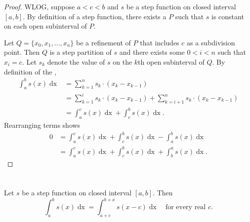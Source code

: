 \documentclass{report}
\begin{document}
\begin{proof}

  WLOG, suppose $a < c < b$ and $s$ be a step function on closed interval
    $[a, b]$.
  By definition of a step function, there exists a 
    $P$ such that $s$ is constant on each open subinterval of $P$.

  Let $Q = \{x_0, x_1, \ldots, x_n\}$ be a refinement of $P$ that includes $c$
    as a subdivision point.
  Then $Q$ is a step partition of $s$ and there exists some $0 < i < n$ such
    that $x_i = c$.
  Let $s_k$ denote the value of $s$ on the $k$th open subinterval of $Q$.
  By definition of the ,
    \begin{align*}
      \int_a^b s(x) \mathop{dx}
        & = \sum_{k=1}^n s_k \cdot (x_k - x_{k - 1}) \\
        & = \sum_{k=1}^i s_k \cdot (x_k - x_{k - 1}) +
            \sum_{k=i+1}^n s_k \cdot (x_k - x_{k - 1}) \\
        & = \int_a^c s(x) \mathop{dx} + \int_c^b s(x) \mathop{dx}.
    \end{align*}
  Rearranging terms shows
    \begin{align*}
      0
        & = \int_a^c s(x) \mathop{dx} + \int_c^b s(x) \mathop{dx} -
            \int_a^b s(x) \mathop{dx} \\
        & = \int_a^c s(x) \mathop{dx} + \int_c^b s(x) \mathop{dx} +
            \int_b^a s(x) \mathop{dx}.
    \end{align*}

\end{proof}

\section{}%
\label{sec:step-invariance-under-translation}

Let $s$ be a step function on closed interval $[a, b]$.
Then
  $$\int_a^b s(x) \mathop{dx} =
    \int_{a+c}^{b+x} s(x - c) \mathop{dx} \quad\text{for every real } c.$$
\end{document}
